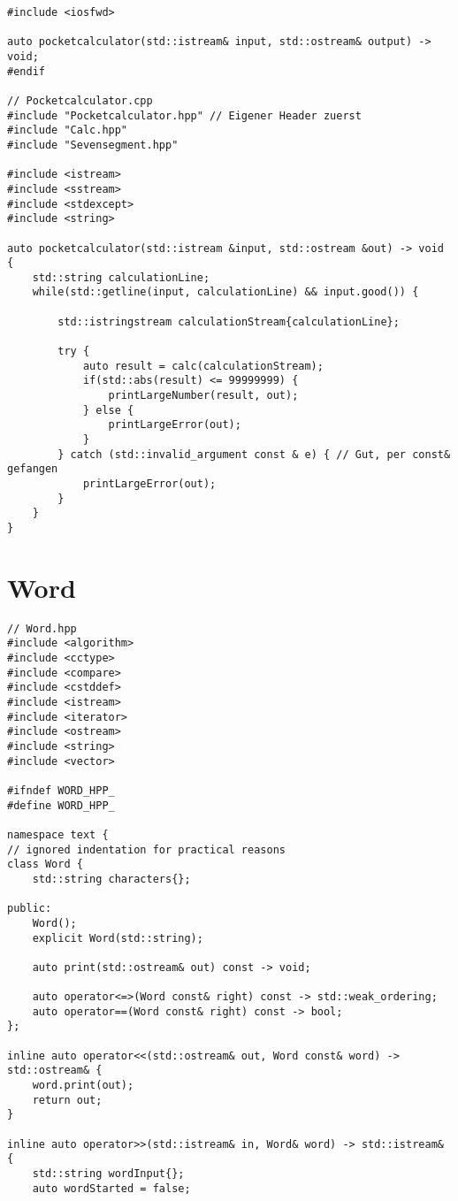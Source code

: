\begin{multicols*}{3}
\begin{verbatim}
#include <iosfwd>

auto pocketcalculator(std::istream& input, std::ostream& output) -> void;
#endif

// Pocketcalculator.cpp
#include "Pocketcalculator.hpp" // Eigener Header zuerst
#include "Calc.hpp"
#include "Sevensegment.hpp"

#include <istream>
#include <sstream>
#include <stdexcept>
#include <string>

auto pocketcalculator(std::istream &input, std::ostream &out) -> void {
    std::string calculationLine;
    while(std::getline(input, calculationLine) && input.good()) {

        std::istringstream calculationStream{calculationLine};

        try {
            auto result = calc(calculationStream);
            if(std::abs(result) <= 99999999) {
                printLargeNumber(result, out);
            } else {
                printLargeError(out);
            }
        } catch (std::invalid_argument const & e) { // Gut, per const& gefangen
            printLargeError(out);
        }
    }
}
\end{verbatim}

\section{Word}

\begin{verbatim}
// Word.hpp
#include <algorithm>
#include <cctype>
#include <compare>
#include <cstddef>
#include <istream>
#include <iterator>
#include <ostream>
#include <string>
#include <vector>

#ifndef WORD_HPP_
#define WORD_HPP_

namespace text {
// ignored indentation for practical reasons
class Word {
    std::string characters{};

public:
    Word();
    explicit Word(std::string);

    auto print(std::ostream& out) const -> void;

    auto operator<=>(Word const& right) const -> std::weak_ordering;
    auto operator==(Word const& right) const -> bool;
};

inline auto operator<<(std::ostream& out, Word const& word) -> std::ostream& {
    word.print(out);
    return out;
}

inline auto operator>>(std::istream& in, Word& word) -> std::istream& {
    std::string wordInput{};
    auto wordStarted = false;


\end{verbatim}
\end{multicols*}

